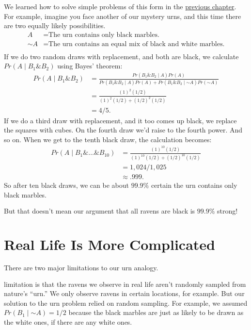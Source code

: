 \documentclass[justified]{tufte-book}
\newcommand{\given}{\mid}
\renewcommand{\neg}{\mathbin{\sim}}
\renewcommand{\wedge}{\mathbin{\&}}
\newcommand{\p}{Pr}
\theoremstyle{definition}
\theoremstyle{definition}
\theoremstyle{definition}
\theoremstyle{definition}
\theoremstyle{remark}
\begin{document}
We learned how to solve simple problems of this form in the \protect\hyperlink{multiple-draws}{previous chapter}. For example, imagine you face another of our mystery urns, and this time there are two equally likely possibilities.
\[
  \begin{aligned}
    A      &= \mbox{The urn contains only black marbles.} \\
    \neg A &= \mbox{The urn contains an equal mix of black and white marbles.} \\
  \end{aligned}
\]
If we do two random draws with replacement, and both are black, we calculate \(\p(A \given B_1 \wedge B_2)\) using Bayes' theorem:
\[
  \begin{aligned}
    \p(A \given B_1 \wedge B_2) &= \frac{\p(B_1 \wedge B_2 \given A)\p(A)}{\p(B_1 \wedge B_2 \given A) \p(A) + \p(B_1 \wedge B_2 \given \neg A) \p(\neg A)} \\ 
    &= \frac{(1)^2(1/2)}{(1)^2(1/2) + (1/2)^2(1/2)}\\
    &= 4/5.
  \end{aligned}
\]
If we do a third draw with replacement, and it too comes up black, we replace the squares with cubes. On the fourth draw we'd raise to the fourth power. And so on. When we get to the tenth black draw, the calculation becomes:
\[
  \begin{aligned}
    \p(A \given B_1 \wedge \ldots \wedge B_{10}) &= \frac{(1)^{10}(1/2)}{(1)^{10}(1/2) + (1/2)^{10}(1/2)}\\
    &= 1,024/1,025\\
    &\approx .999.
  \end{aligned}
\]
So after ten black draws, we can be about \(99.9\%\) certain the urn contains only black marbles.

But that doesn't mean our argument that all ravens are black is \(99.9\%\) strong!

\hypertarget{real-life-is-more-complicated}{%
\section{Real Life Is More Complicated}\label{real-life-is-more-complicated}}

There are two major limitations to our urn analogy.

 limitation is that the ravens we observe in real life aren't randomly sampled from nature's ``urn.'' We only observe ravens in certain locations, for example. But our solution to the urn problem relied on random sampling. For example, we assumed \(\p(B_1 \given \neg A) = 1/2\) because the black marbles are just as likely to be drawn as the white ones, if there are any white ones.
\end{document}
